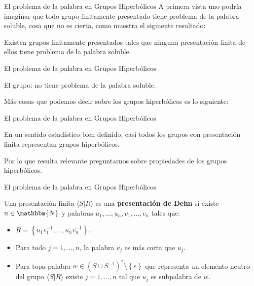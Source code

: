 \documentclass[xcolor=dvipsnames]{beamer}
\theoremstyle{largebreak}
\newcommand{\bbm}[1]{\ensuremath{\mathbbm{#1}}}
\newcommand{\gen}[1]{\ensuremath{\langle#1\rangle}}
\begin{document}
\begin{frame}{El problema de la palabra en Grupos Hiperbólicos}
    A primera vista uno podría imaginar que todo grupo finitamente presentado tiene problema de la palabra soluble, cosa que no es cierta, como muestra el siguiente resultado:

    \begin{theor}
        Existen grupos finitamente presentados tales que ninguna presentación finita de ellos tiene problema de la palabra soluble.
    \end{theor}
\end{frame}

\begin{frame}{El problema de la palabra en Grupos Hiperbólicos}
    \begin{exa}
        El grupo:
        no tiene problema de la palabra soluble.
    \end{exa}

    Más cosas que podemos decir sobre los grupos hiperbólicos es lo siguiente:
\end{frame}

\begin{frame}{El problema de la palabra en Grupos Hiperbólicos}
    \begin{theor}
        En un sentido estadístico bien definido, casi todos los grupos con presentación finita representan grupos hiperbólicos.
    \end{theor}

    Por lo que resulta relevante preguntarnos sobre propiedades de los grupos hiperbólicos.
\end{frame}

\begin{frame}{El problema de la palabra en Grupos Hiperbólicos}
    \begin{mydef}
        Una presentación finita $\gen{S|R}$ es una \textbf{presentación de Dehn} si existe $n\in\bbm{N}$ y palabras $u_1,...,u_n,v_1,...,v_n$ tales que:
        \begin{itemize}
            \item $R=\left\{u_1v_1^{-1},...,u_nv_n^{-1} \right\}$.
            \item Para todo $j=1,...,n$, la palabra $v_j$ es más corta que $u_j$.
            \item Para topa palabra $w\in(S\cup S^{-1})^*\setminus\left\{e\right\}$ que representa un elemento neutro del grupo $\gen{S|R}$ existe $j=1,...,n$ tal que $u_j$ es subpalabra de $w$.
        \end{itemize}
    \end{mydef}
\end{frame}
\end{document}
